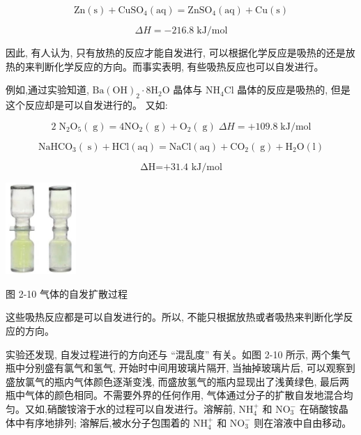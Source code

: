 \documentclass[10pt]{article}
\begin{document}
\[
\mathrm{{Zn}}\left( \mathrm{s}\right) + {\mathrm{{CuSO}}}_{4}\left( \mathrm{{aq}}\right) = {\mathrm{{ZnSO}}}_{4}\left( \mathrm{{aq}}\right) + \mathrm{{Cu}}\left( \mathrm{s}\right)
\]

\[
{\Delta H} = - {216.8}\mathrm{\;{kJ}}/\mathrm{{mol}}
\]

因此, 有人认为, 只有放热的反应才能自发进行, 可以根据化学反应是吸热的还是放热的来判断化学反应的方向。而事实表明, 有些吸热反应也可以自发进行。

例如,通过实验知道, \(\mathrm{{Ba}}{\left( \mathrm{{OH}}\right) }_{2} \cdot 8{\mathrm{H}}_{2}\mathrm{O}\) 晶体与 \({\mathrm{{NH}}}_{4}\mathrm{{Cl}}\) 晶体的反应是吸热的, 但是这个反应却是可以自发进行的。 又如:

\[
2{\mathrm{\;N}}_{2}{\mathrm{O}}_{5}\left( \mathrm{\;g}\right) = 4{\mathrm{{NO}}}_{2}\left( \mathrm{\;g}\right) + {\mathrm{O}}_{2}\left( \mathrm{\;g}\right) \;{\Delta H} = + {109.8}\mathrm{\;{kJ}}/\mathrm{{mol}}
\]

\[
{\mathrm{{NaHCO}}}_{3}\left( \mathrm{\;s}\right) + \mathrm{{HCl}}\left( \mathrm{{aq}}\right) = \mathrm{{NaCl}}\left( \mathrm{{aq}}\right) + {\mathrm{{CO}}}_{2}\left( \mathrm{\;g}\right) + {\mathrm{H}}_{2}\mathrm{O}\left( \mathrm{l}\right)
\]

\[
\text{ΔH=+31.4 kJ/mol}
\]

\begin{center}
\includegraphics[max width=0.2\textwidth]{images/0190da9d-8bfd-732f-bc2c-0b21d0f13b91_48_560290.jpg}
\end{center}

图 2-10 气体的自发扩散过程

这些吸热反应都是可以自发进行的。所以, 不能只根据放热或者吸热来判断化学反应的方向。

实验还发现, 自发过程进行的方向还与 “混乱度” 有关。如图 2-10 所示, 两个集气瓶中分别盛有氯气和氢气, 开始时中间用玻璃片隔开, 当抽掉玻璃片后, 可以观察到盛放氯气的瓶内气体颜色逐渐变浅, 而盛放氢气的瓶内显现出了浅黄绿色, 最后两瓶中气体的颜色相同。不需要外界的任何作用, 气体通过分子的扩散自发地混合均匀。又如,硝酸铵溶于水的过程可以自发进行。溶解前, \({\mathrm{{NH}}}_{4}^{ + }\) 和 \({\mathrm{{NO}}}_{3}^{ - }\) 在硝酸铵晶体中有序地排列; 溶解后,被水分子包围着的 \({\mathrm{{NH}}}_{4}^{ + }\) 和 \({\mathrm{{NO}}}_{3}^{ - }\) 则在溶液中自由移动。
\end{document}
